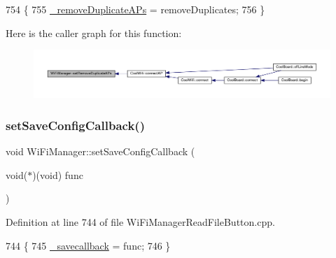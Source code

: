 \begin{DoxyCode}
754                                                                 \{
755   \hyperlink{class_wi_fi_manager_a94d25bd8d02bbf0236d75dfd8ee682d7}{\_removeDuplicateAPs} = removeDuplicates;
756 \}
\end{DoxyCode}
Here is the caller graph for this function\+:\nopagebreak
\begin{figure}[H]
\begin{center}
\leavevmode
\includegraphics[width=350pt]{d4/dc8/class_wi_fi_manager_a4dd1dbf4f22900f226a3897b88155212_icgraph}
\end{center}
\end{figure}
\mbox{\label{class_wi_fi_manager_a3666ca145de5e28d943db54fcb204e65}} 
\subsubsection{\texorpdfstring{set\+Save\+Config\+Callback()}{setSaveConfigCallback()}}
{\footnotesize\ttfamily void Wi\+Fi\+Manager\+::set\+Save\+Config\+Callback (\begin{DoxyParamCaption}\item[{void($\ast$)(void)}]{func }\end{DoxyParamCaption})}



Definition at line 744 of file Wi\+Fi\+Manager\+Read\+File\+Button.\+cpp.


\begin{DoxyCode}
744                                                             \{
745   \hyperlink{class_wi_fi_manager_a9a316060184788e33e71d88101cb2e0d}{\_savecallback} = func;
746 \}
\end{DoxyCode}
\mbox{\label{class_wi_fi_manager_a124d89536d0ba5b5bd117e6c44a53e8d}} 
